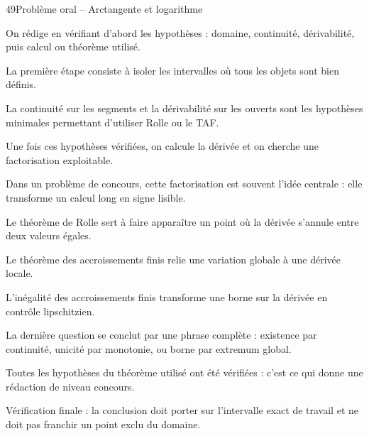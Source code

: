 \documentclass[11pt,a4paper]{article}
\begin{document}
\begin{corrbox}{49}{Problème oral -- Arctangente et logarithme}

\begin{methodebox}
On rédige en vérifiant d'abord les hypothèses : domaine, continuité, dérivabilité, puis calcul ou théorème utilisé.
\end{methodebox}

La première étape consiste à isoler les intervalles où tous les objets sont bien définis.


La continuité sur les segments et la dérivabilité sur les ouverts sont les hypothèses minimales permettant d'utiliser Rolle ou le TAF.


Une fois ces hypothèses vérifiées, on calcule la dérivée et on cherche une factorisation exploitable.


Dans un problème de concours, cette factorisation est souvent l'idée centrale : elle transforme un calcul long en signe lisible.


Le théorème de Rolle sert à faire apparaître un point où la dérivée s'annule entre deux valeurs égales.


Le théorème des accroissements finis relie une variation globale à une dérivée locale.


L'inégalité des accroissements finis transforme une borne sur la dérivée en contrôle lipschitzien.


La dernière question se conclut par une phrase complète : existence par continuité, unicité par monotonie, ou borne par extremum global.


Toutes les hypothèses du théorème utilisé ont été vérifiées : c'est ce qui donne une rédaction de niveau concours.


\begin{attentionbox}
Vérification finale : la conclusion doit porter sur l'intervalle exact de travail et ne doit pas franchir un point exclu du domaine.
\end{attentionbox}

\end{corrbox}
\end{document}

